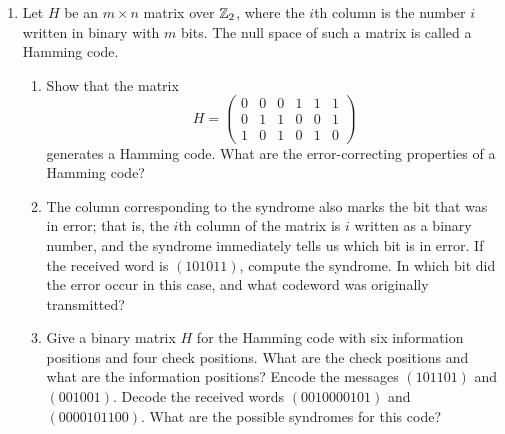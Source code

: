{\begin{enumerate}
\begin{enumerate}
 \bf\item\rm
Find the dual code of the linear code $C$ where $C$ is given by the
matrix 
\[
\left(
\begin{array}{ccccc}
1 & 1 & 1 & 0 & 0 \\
0 & 0 & 1 & 0 & 1 \\
1 & 0 & 0 & 1 & 0
\end{array}
\right).
\]
 
 \bf\item\rm
Show that $C^\perp$ is an $(n, n-k)$-linear code.
 
 \bf\item\rm
Find the standard generator and parity-check matrices of $C$ and
$C^\perp$. What happens in general? Prove your conjecture. 
 
\end{enumerate}
 
 
\bf\item\rm
Let $H$ be an $m \times n$ matrix over ${\Bbb Z}_2$, where the $i$th
column is the number $i$ written in binary with $m$ bits. The null
space of such a matrix is called a {\bfi Hamming
code}. 
\begin{enumerate}
 
 \bf\item\rm
Show  that the matrix
\[
H =
\left(
\begin{array}{cccccc}
0 & 0 & 0 & 1 & 1 & 1 \\
0 & 1 & 1 & 0 & 0 & 1 \\
1 & 0 & 1 & 0 & 1 & 0
\end{array}
\right)
\]
generates a Hamming code. What are the error-correcting properties of
a Hamming code? 
 
 \bf\item\rm
The column corresponding to the syndrome also marks the bit that was
in error; that is, the $i$th column of the matrix is $i$ written as a
binary number, and the syndrome 
immediately tells us which bit is in error. If the received word is 
$(101011)$, compute the syndrome.  In
which bit did the error occur in this case, and what codeword was
originally transmitted?
 
 \bf\item\rm
Give a binary matrix $H$ for the Hamming code with six information
positions and four check positions. What are the check positions and
what are the information positions? Encode the messages $(101101)$ and
$(001001)$. Decode the received words $(0010000101)$ and
$(0000101100)$.  What are the possible syndromes for this code?
 

\end{enumerate}
\end{enumerate}}
